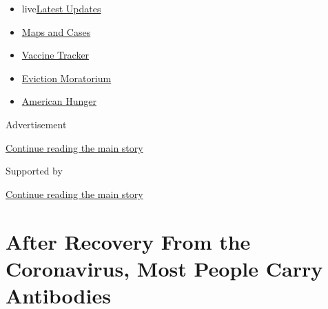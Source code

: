 \begin{itemize}
\tightlist
\item
  live\href{https://www.nytimes3xbfgragh.onion/2020/09/09/world/covid-19-coronavirus.html?name=styln-coronavirus-national\&region=TOP_BANNER\&block=storyline_menu_recirc\&action=click\&pgtype=Article\&impression_id=c9eecf11-f283-11ea-b022-6936941775de\&variant=undefined}{Latest
  Updates}
\item
  \href{https://www.nytimes3xbfgragh.onion/interactive/2020/us/coronavirus-us-cases.html?name=styln-coronavirus-national\&region=TOP_BANNER\&block=storyline_menu_recirc\&action=click\&pgtype=Article\&impression_id=c9eef620-f283-11ea-b022-6936941775de\&variant=undefined}{Maps
  and Cases}
\item
  \href{https://www.nytimes3xbfgragh.onion/interactive/2020/science/coronavirus-vaccine-tracker.html?name=styln-coronavirus-national\&region=TOP_BANNER\&block=storyline_menu_recirc\&action=click\&pgtype=Article\&impression_id=c9eef621-f283-11ea-b022-6936941775de\&variant=undefined}{Vaccine
  Tracker}
\item
  \href{https://www.nytimes3xbfgragh.onion/2020/09/02/your-money/eviction-moratorium-covid.html?name=styln-coronavirus-national\&region=TOP_BANNER\&block=storyline_menu_recirc\&action=click\&pgtype=Article\&impression_id=c9eef622-f283-11ea-b022-6936941775de\&variant=undefined}{Eviction
  Moratorium}
\item
  \href{https://www.nytimes3xbfgragh.onion/interactive/2020/09/02/magazine/food-insecurity-hunger-us.html?name=styln-coronavirus-national\&region=TOP_BANNER\&block=storyline_menu_recirc\&action=click\&pgtype=Article\&impression_id=c9eef623-f283-11ea-b022-6936941775de\&variant=undefined}{American
  Hunger}
\end{itemize}

Advertisement

\protect\hyperlink{after-top}{Continue reading the main story}

Supported by

\protect\hyperlink{after-sponsor}{Continue reading the main story}

\hypertarget{after-recovery-from-the-coronavirus-most-people-carry-antibodies}{%
\section{After Recovery From the Coronavirus, Most People Carry
Antibodies}\label{after-recovery-from-the-coronavirus-most-people-carry-antibodies}}

